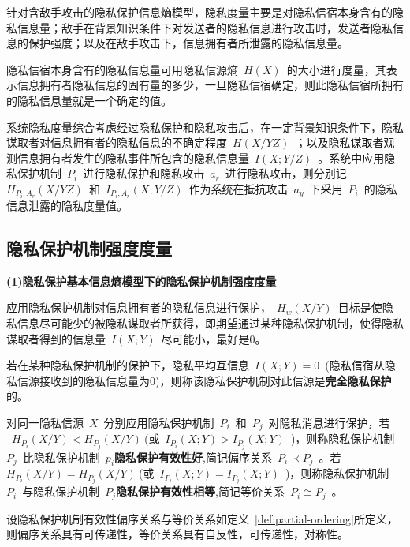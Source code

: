 针对含敌手攻击的隐私保护信息熵模型，隐私度量主要是对隐私信宿本身含有的隐私信息量；敌手在背景知识条件下对发送者的隐私信息进行攻击时，发送者隐私信息的保护强度；以及在敌手攻击下，信息拥有者所泄露的隐私信息量。

隐私信宿本身含有的隐私信息量可用隐私信源熵~$H(X)$~的大小进行度量，其表示信息拥有者隐私信息的固有量的多少，一旦隐私信宿确定，则此隐私信宿所拥有的隐私信息量就是一个确定的值。

系统隐私度量综合考虑经过隐私保护和隐私攻击后，在一定背景知识条件下，隐私谋取者对信息拥有者的隐私信息的不确定程度~$H(X/YZ)$~；以及隐私谋取者观测信息拥有者发生的隐私事件所包含的隐私信息量~$I(X;Y/Z)$~。系统中应用隐私保护机制~$P_{i}$~进行隐私保护和隐私攻击~$a_{r}$~进行隐私攻击，则分别记~$H_{P_{i},A_{r}}(X/YZ)$~和~$I_{P_{i},A_{r}}(X;Y/Z)$~作为系统在抵抗攻击~$a_{y}$~下采用~$P_{i}$~的隐私信息泄露的隐私度量值。

\subsection{隐私保护机制强度度量}
\textbf{(1)隐私保护基本信息熵模型下的隐私保护机制强度度量}

应用隐私保护机制对信息拥有者的隐私信息进行保护，~$H_{w}(X/Y)$~目标是使隐私信息尽可能少的被隐私谋取者所获得，即期望通过某种隐私保护机制，使得隐私谋取者得到的信息量~$I(X;Y)$~尽可能小，最好是0。
\begin{definition}
	\label{def:perfec-privacy-preserving}
	若在某种隐私保护机制的保护下，隐私平均互信息~$I(X;Y)=0$~(隐私信宿从隐私信源接收到的隐私信息量为0)，则称该隐私保护机制对此信源是\textbf{完全隐私保护}的。
\end{definition}

\begin{definition}
\label{def:partial-ordering}	
	 对同一隐私信源~$X$~分别应用隐私保护机制~$P_{i}$~和~$P_{j}$~对隐私消息进行保护，若\\~$H_{P_{i}}(X/Y)<H_{P_{j}}(X/Y)~$(或~$I_{P_{i}}(X;Y)>I_{P_{j}}(X;Y)$~)，则称隐私保护机制~$P_{j}$~比隐私保护机制~$p_{i}$\textbf{隐私保护有效性好},简记偏序关系~$P_{i}\prec P_{j}$~。若~$H_{P_{i}}(X/Y)=H_{P_{j}}(X/Y)~$(或~$I_{P_{i}}(X;Y)=I_{P_{j}}(X;Y)$~)，则称隐私保护机制~$P_{i}$~与隐私保护机制~$P_{j}$\textbf{隐私保护有效性相等},简记等价关系~$P_{i}\cong P_{j}$~。
\end{definition}

\begin{theorem}
	\label{thm:distance-properties}
	设隐私保护机制有效性偏序关系与等价关系如定义~\ref{def:partial-ordering}所定义，则偏序关系具有可传递性，等价关系具有自反性，可传递性，对称性。
\end{theorem}

